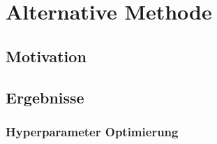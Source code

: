 \section{Alternative Methode}

\subsection{Motivation}

\subsection{Ergebnisse}

\subsubsection{Hyperparameter Optimierung}
